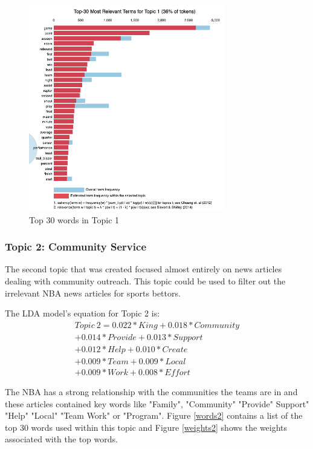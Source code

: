 \documentclass[5p,authoryear]{elsarticle}
\begin{document}
\begin{figure}[!htb] \centering
	\includegraphics[width=3.4in]{figures/top_topic1.png}
	\caption[]{Top 30 words in Topic 1} 
	\label{words1} 
\end{figure}

\subsubsection{Topic 2: Community Service}


The second topic that was created focused almost entirely on news articles dealing with community outreach. 
This topic could be used to filter out the irrelevant NBA news articles for sports bettors.

The LDA model's equation for Topic 2 is:
\begin{align*}
    Topic\ 2 = 0.022*King + 0.018*Community \\
    + 0.014*Provide + 0.013*Support \\
    + 0.012*Help + 0.010*Create \\
    + 0.009*Team + 0.009*Local \\
    + 0.009*Work + 0.008*Effort 
    \label{eq:2}
\end{align*}

The NBA has a strong relationship with the communities the teams are in and these articles contained key words like "Family", "Community" "Provide" Support" "Help" "Local" "Team Work" or "Program". 
Figure \ref{words2} contains a list of the top 30 words used within this topic and Figure \ref{weights2} shows the weights associated with the top words. 
\end{document}
